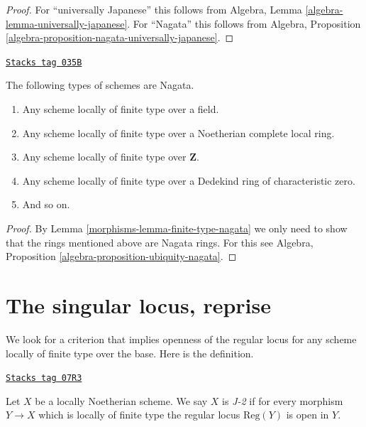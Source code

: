 \begin{proof}
For ``universally Japanese'' this follows from
Algebra, Lemma \ref{algebra-lemma-universally-japanese}.
For ``Nagata'' this follows from
Algebra, Proposition \ref{algebra-proposition-nagata-universally-japanese}.
\end{proof}

\begin{lemma}
\label{morphisms-lemma-ubiquity-nagata}
\href{https://stacks.math.columbia.edu/tag/035B}{\texttt{Stacks tag 035B}}

The following types of schemes are Nagata.
\begin{enumerate}
\item Any scheme locally of finite type over a field.
\item Any scheme locally of finite type over a Noetherian complete local ring.
\item Any scheme locally of finite type over $\mathbf{Z}$.
\item Any scheme locally of finite type over a Dedekind ring of
characteristic zero.
\item And so on.
\end{enumerate}
\end{lemma}

\begin{proof}

By Lemma \ref{morphisms-lemma-finite-type-nagata} we only need to show that
the rings mentioned above are Nagata rings. For this see
Algebra, Proposition \ref{algebra-proposition-ubiquity-nagata}.
\end{proof}

\section{The singular locus, reprise}
\label{morphisms-section-singular-locus}
We look for a criterion that implies openness of the regular locus for
any scheme locally of finite type over the base. Here is the definition.

\begin{definition}[J]
\label{morphisms-definition-J}
\href{https://stacks.math.columbia.edu/tag/07R3}{\texttt{Stacks tag 07R3}}

Let $X$ be a locally Noetherian scheme. We say $X$ is {\it J-2}
if for every morphism $Y \to X$ which is locally of finite type
the regular locus $\text{Reg}(Y)$ is open in $Y$.
\end{definition}

